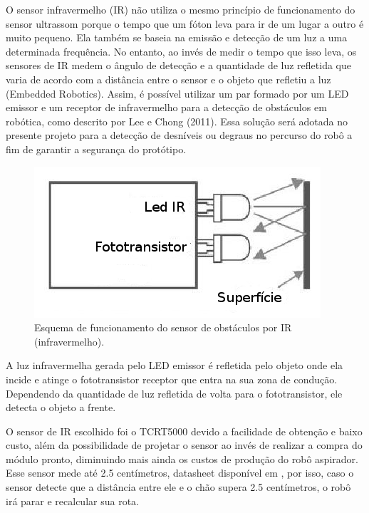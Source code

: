 \begin{enumerate}
  		O sensor infravermelho (IR) não utiliza o mesmo princípio de funcionamento do sensor ultrassom porque o tempo que um fóton leva para ir de um lugar a outro é muito pequeno. Ela também se baseia na emissão e detecção de um luz a uma determinada frequência. No entanto, ao invés de medir o tempo que isso leva, os sensores de IR medem o ângulo de detecção e a quantidade de luz refletida que varia de acordo com a distância entre o sensor e o objeto que refletiu a luz (Embedded Robotics). Assim, é possível utilizar um par formado por um LED emissor e um receptor de infravermelho para a detecção de obstáculos em robótica, como descrito por Lee e Chong (2011).  Essa solução será adotada no presente projeto para a detecção de desníveis ou degraus no percurso do robô a fim de garantir a segurança do protótipo. \cite{detectar_objeto}

  		\begin{figure}[H]                                                           
      		\centering                                                                
      		\includegraphics[scale=0.5]{figuras/funcionamento_sensor_obstaculo.png}               
      		\caption{Esquema de funcionamento do sensor de obstáculos por IR (infravermelho).}    
      		\label{img:esquema_sensor_proximidade}                                            
    	\end{figure}     

    	A luz infravermelha gerada pelo LED emissor é refletida pelo objeto onde ela incide e atinge o fototransistor receptor que entra na sua zona de condução. Dependendo da quantidade de luz refletida de volta para o fototransistor, ele detecta o objeto a frente.

    	O sensor de IR escolhido foi o TCRT5000 devido a facilidade de obtenção e baixo custo, além da possibilidade de projetar o sensor ao invés de realizar a compra do módulo pronto, diminuindo mais ainda os custos de produção do robô aspirador. Esse sensor mede até 2.5 centímetros, datasheet disponível em \cite{datasheet_ir}, por isso, caso o sensor detecte que a distância entre ele e o chão supera 2.5 centímetros, o robô irá parar e recalcular sua rota.


  \end{enumerate}
  	

